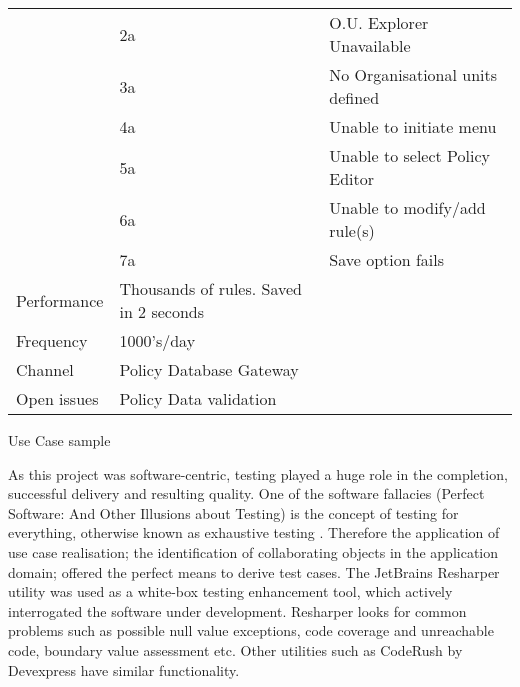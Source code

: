 \begin{tablehere}
{\begin{tabular}{ | p{35mm} | p{55mm} | p{50mm} |}
											& 2a													&	O.U. Explorer Unavailable					\\ \cline{2-3}
											& 3a													&	No Organisational units defined								\\ \cline{2-3}
											& 4a													&	Unable to initiate menu										\\ \cline{2-3}
											& 5a													&	Unable to select Policy Editor								\\ \cline{2-3}
											& 6a													&	Unable to modify/add rule(s)								\\ \cline{2-3}
											& 7a													&	Save option fails											\\ \hline
		Performance							& Thousands of rules. Saved in 2 seconds				&																\\ \hline
		Frequency		 		 	 	 	& 1000's/day											&																\\ \hline
		Channel				 		 	 	& Policy Database Gateway								&																\\ \hline
		Open issues			 		 	 	& Policy Data validation								&																\\ \hline
		\end{tabular}}
		
		\vspace{-3mm}
		\caption{Use Case sample}			
		\label{tab:UseCasesample}
				
	\end{tablehere}
	
\newpage
	
	\normalsize
	{
		As this project was software-centric, testing played a huge role in the completion, successful delivery and resulting quality.
		One of the software fallacies (Perfect Software: And Other Illusions about Testing) 
		is the concept of testing for everything, otherwise known as exhaustive testing \citet{WeinbergSoftwareTesting}.   
		Therefore the application of use case realisation; the identification of collaborating objects in the application
		domain; offered the perfect means to derive test cases.
		\newline
		\newline
		The JetBrains Resharper utility was used as a white-box testing enhancement tool, which actively interrogated 
		the software under development.  Resharper looks for common problems such as possible null value exceptions, 
		code coverage and unreachable code, boundary value assessment etc.  Other utilities such as CodeRush by Devexpress have similar
		functionality.
	}
	